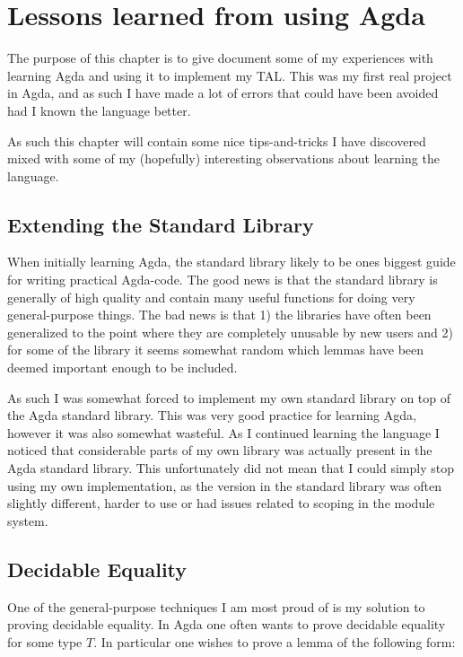 \chapter{Lessons learned from using Agda}
\label{chap:hindsight}

The purpose of this chapter is to give document some of my experiences with
learning Agda and using it to implement my TAL. This was my first real project
in Agda, and as such I have made a lot of errors that could have been avoided
had I known the language better.

As such this chapter will contain some nice tips-and-tricks I have discovered
mixed with some of my (hopefully) interesting observations about learning the
language.

\section{Extending the Standard Library}

When initially learning Agda, the standard library likely to be ones biggest
guide for writing practical Agda-code. The good news is that the standard
library is generally of high quality and contain many useful functions for doing
very general-purpose things. The bad news is that 1) the libraries have often
been generalized to the point where they are completely unusable by new users
and 2) for some of the library it seems somewhat random which lemmas have been
deemed important enough to be included.

As such I was somewhat forced to implement my own standard library on top of the
Agda standard library. This was very good practice for learning Agda, however it
was also somewhat wasteful. As I continued learning the language I noticed that
considerable parts of my own library was actually present in the Agda standard
library. This unfortunately did not mean that I could simply stop using my own
implementation, as the version in the standard library was often slightly
different, harder to use or had issues related to scoping in the module system.

\section{Decidable Equality}
\label{sec:deceq}

One of the general-purpose techniques I am most proud of is my solution to
proving decidable equality. In Agda one often wants to prove decidable equality
for some type $T$. In particular one wishes to prove a lemma of the following
form:

